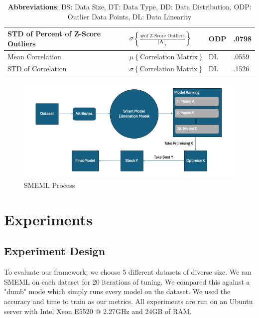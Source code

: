 \documentclass{article}
\begin{document}
\begin{table}
\begin{tabular}{llll}
    \hline
    STD of Percent of Z-Score Outliers  &
    $\sigma \left\{ \frac{\text{\# of Z-Score Outliers}}{|\mathbf{A}|_r} \right\}$ & ODP & .0798 \\
    \hline
    Mean Correlation& $\mu \left\{\text{Correlation Matrix}\right\}$ & DL & .0559 \\
    \hline
    STD of Correlation & $\sigma \left\{\text{Correlation Matrix}\right\}$ & DL & .1526 \\
    \bottomrule
  \end{tabular}
  \captionsetup{font=footnotesize}
  \caption*{\textbf{Abbreviations}: DS: Data Size, DT: Data Type, DD: Data Distribution, ODP: Outlier Data Points, DL: Data Linearity}
\end{table}


\begin {figure}
\centering
\includegraphics[width=\textwidth]{smeml-flowchart.png}
\caption{SMEML Process}
\end{figure}

\section{Experiments}
\subsection{Experiment Design}
To evaluate our framework, we choose 5 different datasets of diverse size. We ran SMEML on each dataset for 20 iterations of tuning. We compared this against a "dumb" mode which simply runs every model on the dataset. We used the accuracy and time to train as our metrics. All experiments are run on an Ubuntu server with Intel Xeon E5520 @ 2.27GHz and 24GB of RAM.
\end{document}
